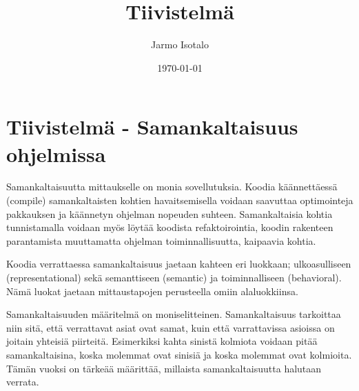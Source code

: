 \documentclass[finnish]{tktltiki2}
\title{Tiivistelmä}
\author{Jarmo Isotalo}
\date{\today}
\theoremstyle{definition}
\theoremstyle{remark}
\begin{document}

\frontmatter      %

\maketitle        %


\mainmatter
\section{Tiivistelmä - Samankaltaisuus ohjelmissa}

Samankaltaisuutta mittaukselle on monia sovellutuksia. Koodia käännettäessä (compile) samankaltaisten kohtien havaitsemisella voidaan saavuttaa optimointeja pakkauksen ja käännetyn ohjelman nopeuden suhteen. %
Samankaltaisia kohtia tunnistamalla voidaan myös löytää koodista refaktoirointia, koodin rakenteen parantamista muuttamatta ohjelman toiminnallisuutta, kaipaavia kohtia. %


Koodia verrattaessa samankaltaisuus jaetaan kahteen eri luokkaan; ulkoasulliseen (representational) sekä semanttiseen (semantic) ja toiminnalliseen (behavioral). Nämä luokat jaetaan mittaustapojen perusteella omiin alaluokkiinsa.

Samankaltaisuuden määritelmä on moniselitteinen. Samankaltaisuus tarkoittaa niin sitä, että verrattavat asiat ovat samat, kuin että varrattavissa asioissa on joitain yhteisiä piirteitä. Esimerkiksi kahta sinistä kolmiota voidaan pitää samankaltaisina, koska molemmat ovat sinisiä ja koska molemmat ovat kolmioita. Tämän vuoksi on tärkeää määrittää, millaista samankaltaisuutta halutaan verrata.
\end{document}
